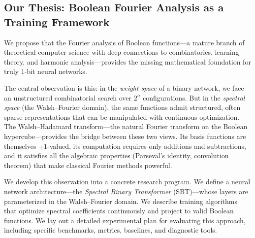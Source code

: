 \documentclass[12pt,a4paper]{article}
\theoremstyle{plain}
\theoremstyle{definition}
\theoremstyle{remark}
\begin{document}
\subsection{Our Thesis: Boolean Fourier Analysis as a Training Framework}\label{sec:thesis}

We propose that the Fourier analysis of Boolean functions---a mature branch of theoretical computer science with deep connections to combinatorics, learning theory, and harmonic analysis---provides the missing mathematical foundation for truly 1-bit neural networks.

The central observation is this: in the \emph{weight space} of a binary network, we face an unstructured combinatorial search over $2^n$ configurations. But in the \emph{spectral space} (the Walsh--Fourier domain), the same functions admit structured, often sparse representations that can be manipulated with continuous optimization. The Walsh--Hadamard transform---the natural Fourier transform on the Boolean hypercube---provides the bridge between these two views. Its basis functions are themselves $\pm 1$-valued, its computation requires only additions and subtractions, and it satisfies all the algebraic properties (Parseval's identity, convolution theorem) that make classical Fourier methods powerful.

We develop this observation into a concrete research program. We define a neural network architecture---the \emph{Spectral Binary Transformer} (SBT)---whose layers are parameterized in the Walsh--Fourier domain. We describe training algorithms that optimize spectral coefficients continuously and project to valid Boolean functions. We lay out a detailed experimental plan for evaluating this approach, including specific benchmarks, metrics, baselines, and diagnostic tools.
\end{document}

